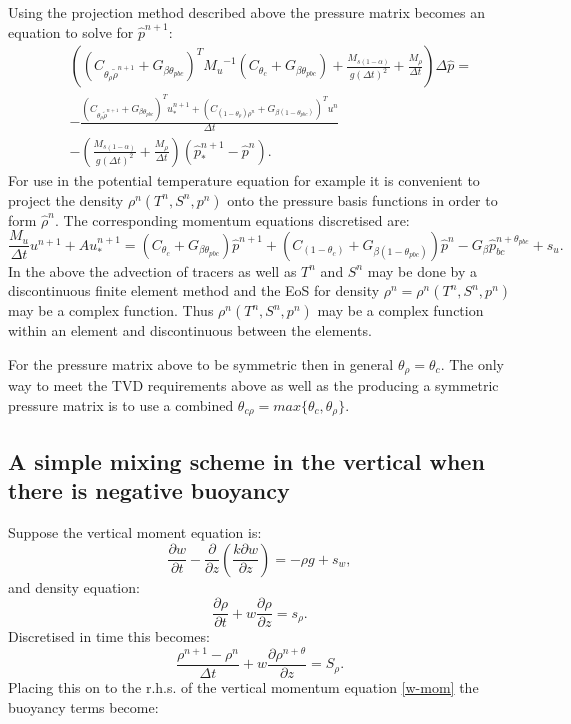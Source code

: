 Using the projection method described above the pressure 
matrix becomes an equation to solve for ${\hat p}^{n+1}$: 
\begin{eqnarray}
&&\left( ( C_{\theta_\rho \tilde \rho^{n+1}} +G_{\beta\theta_{pbc}})^T 
{M_u}^{-1} (  C_{\theta_c} +G_{\beta\theta_{pbc}}) 
+ \frac{M_{s(1-\alpha)}}{g (\Delta t)^2} 
+ \frac{M_{\rho}}{\Delta t} \right) \Delta {\hat p} =  \nonumber\\ 
&& -\frac{
( C_{\theta_\rho \tilde \rho^{n+1}} +G_{\beta\theta_{pbc}})^T u^{n+1}_*
+( C_{(1-\theta_\rho)\rho^n}+G_{\beta(1-\theta_{pbc})})^T u^{n}
}{\Delta t} \nonumber\\ 
&& 
-\left(\frac{M_{s(1-\alpha)}}{g (\Delta t)^2}+\frac{M_{\rho}}{\Delta t}\right)({\hat p}_*^{n+1}-{\hat p}^{n}). 
\label{Ceq5-wet-and-compress}
\end{eqnarray}
For use in the potential temperature equation for example it 
is convenient to project the density $\rho^n(  T^{n},  S^{n},  p^{n}) $ 
onto the pressure basis functions 
in order to form $\hat \rho^n$. 
The corresponding momentum equations discretised are: 
\begin{equation}
\frac{M_u}{\Delta t}u^{n+1}+Au_*^{n+1}=
( C_{\theta_c } +G_{\beta\theta_{pbc}})
{\hat p}^{n+1}
+
( C_{(1-\theta_c)} +G_{\beta(1-\theta_{pbc})})
{\hat p}^n
-G_\beta {\hat p}_{bc}^{n+\theta_{pbc}} +s_u. 
\label{WD-eq1-comp}
\end{equation}
In the above the advection of tracers as well as 
$T^n$ and $S^n$ may be done by a discontinuous 
finite element method and the EoS for density $\rho^n=\rho^{n}
(  T^{n},  S^{n},  p^{n})$ may be a 
complex function. Thus $\rho^{n}
(  T^{n},  S^{n},  p^{n})$ may be a complex function within 
an element and discontinuous between the elements. 

For the pressure matrix above to be symmetric then 
in general $\theta_\rho=\theta_c$. The only way to 
meet the TVD requirements above as well as the producing 
a symmetric pressure matrix is to use a combined 
$\theta_{c\rho}=max\{ \theta_c, \theta_\rho \}$. 



\subsection{A simple mixing scheme 
in the vertical when there is negative buoyancy} 
Suppose the vertical moment equation is: 
\begin{equation}
\frac{\partial w}{\partial t} -  
 \frac{\partial }{\partial z} \left( 
 \frac{ k  \partial w}{\partial z} \right) 
= - \rho g + s_w, 
\label{w-mom}
\end{equation}
and density equation:
\begin{equation}
\frac{\partial \rho}{\partial t} + w\frac{\partial \rho}{\partial z} = s_\rho.
\label{rho-vert-dif}
\end{equation}
Discretised in time this becomes: 
\begin{equation}
\frac{ \rho^{n+1} -\rho^n}{\Delta t} 
+w \frac{\partial \rho^{n+\theta}}{\partial z} = S_\rho.
\label{rho-vert-dif-time-disc}
\end{equation}
Placing this on to the r.h.s. of the vertical momentum equation \ref{w-mom}
the buoyancy terms become: 

